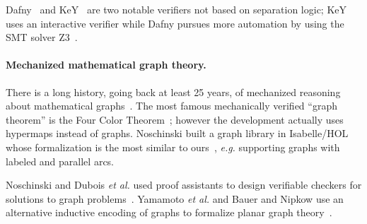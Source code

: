 Dafny~\cite{Leino10} and KeY~\cite{Beckert:2007} are two notable verifiers not based on separation logic; KeY uses an interactive verifier while Dafny pursues more automation by using the SMT solver Z3~\cite{Moura2008}.

\paragraph{Mechanized mathematical graph theory.} There is a long history,
going back at least 25 years, of mechanized reasoning about mathematical
graphs~\cite{wong1991}.  The most famous mechanically verified ``graph theorem''
is the Four Color Theorem~\cite{gonthier2005computer}; however
the development actually uses hypermaps instead of graphs.
Noschinski built a graph library in Isabelle/HOL whose formalization
is the most similar to ours~\cite{Noschinski2015}, \emph{e.g.} supporting
graphs with labeled and parallel arcs.

Noschinski and Dubois \emph{et al.} used proof assistants to design verifiable
checkers for solutions to graph problems~\cite{noschinski2015formalizing,dubois2015graphes}.
Yamamoto \emph{et al.} and Bauer and Nipkow use an alternative inductive
encoding of graphs to formalize planar graph theory~\cite{yamamoto1995formalization,bauer20025}.




